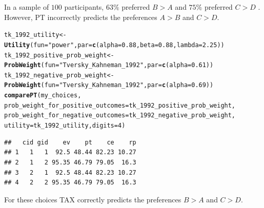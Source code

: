 \documentclass{article}\usepackage[]{graphicx}\usepackage[]{color}
\makeatletter
\newcommand{\hlnum}[1]{\textcolor[rgb]{0.686,0.059,0.569}{#1}}%
\newcommand{\hlstr}[1]{\textcolor[rgb]{0.192,0.494,0.8}{#1}}%
\newcommand{\hlstd}[1]{\textcolor[rgb]{0.345,0.345,0.345}{#1}}%
\newcommand{\hlkwb}[1]{\textcolor[rgb]{0.69,0.353,0.396}{#1}}%
\newcommand{\hlkwc}[1]{\textcolor[rgb]{0.333,0.667,0.333}{#1}}%
\newcommand{\hlkwd}[1]{\textcolor[rgb]{0.737,0.353,0.396}{\textbf{#1}}}%
\newenvironment{kframe}{%
 \def\at@end@of@kframe{}%
 \ifinner\ifhmode%
  \def\at@end@of@kframe{\end{minipage}}%
  \begin{minipage}{\columnwidth}%
 \fi\fi%
 \def\FrameCommand##1{\hskip\@totalleftmargin \hskip-\fboxsep
 \colorbox{shadecolor}{##1}\hskip-\fboxsep
     \hskip-\linewidth \hskip-\@totalleftmargin \hskip\columnwidth}%
 \MakeFramed {\advance\hsize-\width
   \@totalleftmargin\z@ \linewidth\hsize
   \@setminipage}}%
 {\par\unskip\endMakeFramed%
 \at@end@of@kframe}
\newenvironment{knitrout}{}{} %
\makeatother
\begin{document}
In a sample of $100$ participants, $63\%$ preferred $B > A$ and $75\%$ preferred $C > D$ \cite[][Table 3 p. 95 (unframed condition)]{Birnbaum_2004}. However, PT incorrectly predicts the preferences $A > B$ and $C > D$.

\begin{knitrout}
\color{fgcolor}\begin{kframe}
\begin{alltt}
\hlstd{tk_1992_utility} \hlkwb{<-} \hlkwd{Utility}\hlstd{(}\hlkwc{fun}\hlstd{=}\hlstr{"power"}\hlstd{,} \hlkwc{par}\hlstd{=}\hlkwd{c}\hlstd{(}\hlkwc{alpha}\hlstd{=}\hlnum{0.88}\hlstd{,} \hlkwc{beta}\hlstd{=}\hlnum{0.88}\hlstd{,} \hlkwc{lambda}\hlstd{=}\hlnum{2.25}\hlstd{))}
\hlstd{tk_1992_positive_prob_weight} \hlkwb{<-} \hlkwd{ProbWeight}\hlstd{(}\hlkwc{fun}\hlstd{=}\hlstr{"Tversky_Kahneman_1992"}\hlstd{,} \hlkwc{par}\hlstd{=}\hlkwd{c}\hlstd{(}\hlkwc{alpha}\hlstd{=}\hlnum{0.61}\hlstd{))}
\hlstd{tk_1992_negative_prob_weight} \hlkwb{<-} \hlkwd{ProbWeight}\hlstd{(}\hlkwc{fun}\hlstd{=}\hlstr{"Tversky_Kahneman_1992"}\hlstd{,} \hlkwc{par}\hlstd{=}\hlkwd{c}\hlstd{(}\hlkwc{alpha}\hlstd{=}\hlnum{0.69}\hlstd{))}
\hlkwd{comparePT}\hlstd{(my_choices,}
        \hlkwc{prob_weight_for_positive_outcomes}\hlstd{=tk_1992_positive_prob_weight,}
        \hlkwc{prob_weight_for_negative_outcomes}\hlstd{=tk_1992_negative_prob_weight,}
        \hlkwc{utility}\hlstd{=tk_1992_utility,} \hlkwc{digits}\hlstd{=}\hlnum{4}\hlstd{)}
\end{alltt}
\begin{verbatim}
##   cid gid    ev    pt    ce    rp
## 1   1   1  92.5 48.44 82.23 10.27
## 2   1   2 95.35 46.79 79.05  16.3
## 3   2   1  92.5 48.44 82.23 10.27
## 4   2   2 95.35 46.79 79.05  16.3
\end{verbatim}
\end{kframe}
\end{knitrout}


For these choices TAX correctly predicts the preferences $B > A$ and $C > D$.
\end{document}
